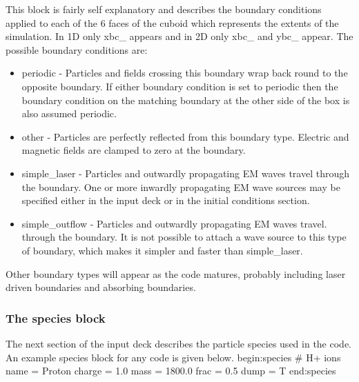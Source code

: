 \documentclass[12pt,a4paper]{article}
\newcommand{\EPOCH}{{\color{warwickdark}\fontfamily{phv}\selectfont{EPOCH}}}
\newenvironment{boxverbatim}{\lboxverbatim{none}}{\endlboxverbatim}
\begin{document}
This block is fairly self explanatory and describes the boundary conditions
applied to each of the 6 faces of the cuboid which represents the extents of
the simulation. In 1D only xbc\_ appears and in 2D only xbc\_ and ybc\_
appear. The possible boundary conditions are:\\
\begin{itemize}
\item periodic - Particles and fields crossing this boundary wrap back round
  to the opposite boundary. If either boundary condition is set to periodic
  then the boundary condition on the matching boundary at the other side of
  the box is also assumed periodic.
\item other - Particles are perfectly reflected from this boundary
  type. Electric and magnetic fields are clamped to zero at the boundary.
\item simple\_laser - Particles and outwardly propagating EM waves travel
  through the boundary. One or more inwardly propagating EM wave sources may
  be specified either in the input deck or in the initial conditions section.
\item simple\_outflow - Particles and outwardly propagating EM waves travel.
  through the boundary. It is not possible to attach a wave source to this
  type of boundary, which makes it simpler and faster than simple\_laser.
\end{itemize}
Other boundary types will appear as the code matures, probably including laser
driven boundaries and absorbing boundaries.\\

\subsubsection{The species block}
The next section of the input deck describes the particle species used in the
code. An example species block for any {\EPOCH} code is given below.
\begin{boxverbatim}
begin:species
   # H+ ions
   name = Proton
   charge = 1.0
   mass = 1800.0
   frac = 0.5
   dump = T
end:species
\end{boxverbatim}
\end{document}
